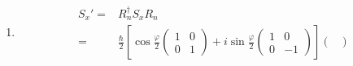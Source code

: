 \begin{enumerate}
\begin{align*}
\begin{pmatrix}
        \end{pmatrix} -i\sin\frac{\varphi}{2}
        \begin{pmatrix}
            \cos\theta & \sin\theta e^{-i\phi}\\
             \sin\theta e^{i\phi}&-\cos\theta 
        \end{pmatrix}
        \right]\\
        =&
        \cos^2\frac{\varphi}{2}\begin{pmatrix}
            1 & 0 \\
            0 & 1
        \end{pmatrix}
        -i\cos\frac{\varphi}{2}\sin\frac{\varphi}{2}
        \begin{pmatrix}
            \cos\theta & \sin\theta e^{-i\phi}\\
             \sin\theta e^{i\phi}&-\cos\theta 
        \end{pmatrix}\\
        &+i
        \cos\frac{\varphi}{2}\sin\frac{\varphi}{2}
        \begin{pmatrix}
            \cos\theta & \sin\theta e^{-i\phi}\\
             \sin\theta e^{i\phi}&-\cos\theta 
        \end{pmatrix}
        +\sin^2\frac{\varphi}{2}
        \begin{pmatrix}
            1 & 0 \\
            0 & 1
        \end{pmatrix}\\
        =&\begin{pmatrix}
            1 & 0 \\
            0 & 1
        \end{pmatrix}
    \end{align*}
    \item 
    \begin{align*}
        S_x'=&R_n^\dagger S_xR_n \\= & 
        \frac{\hbar}{2}\left[\cos\frac{\varphi}{2}
        \begin{pmatrix}
            1 & 0 \\0 & 1
        \end{pmatrix} +i\sin\frac{\varphi}{2}
        \begin{pmatrix}
            1 & 0\\
             0&-1
        \end{pmatrix}
        \right]
        \begin{pmatrix}

\end{pmatrix}
\end{align*}
\end{enumerate}
